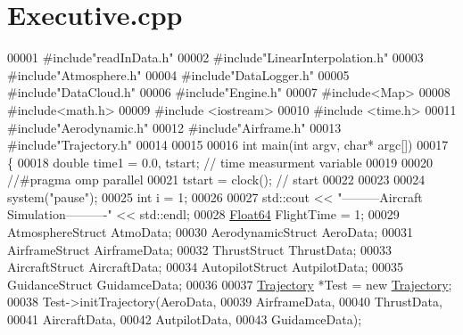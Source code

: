 \hypertarget{_executive_8cpp_source}{}\section{Executive.\+cpp}
\label{_executive_8cpp_source}

\begin{DoxyCode}
00001 \textcolor{preprocessor}{#include"readInData.h"}
00002 \textcolor{preprocessor}{#include"LinearInterpolation.h"}
00003 \textcolor{preprocessor}{#include"Atmosphere.h"}
00004 \textcolor{preprocessor}{#include"DataLogger.h"}
00005 \textcolor{preprocessor}{#include"DataCloud.h"}
00006 \textcolor{preprocessor}{#include"Engine.h"}
00007 \textcolor{preprocessor}{#include<Map>}
00008 \textcolor{preprocessor}{#include<math.h>}
00009 \textcolor{preprocessor}{#include <iostream>}
00010 \textcolor{preprocessor}{#include <time.h>} 
00011 \textcolor{preprocessor}{#include"Aerodynamic.h"}
00012 \textcolor{preprocessor}{#include"Airframe.h"}
00013 \textcolor{preprocessor}{#include"Trajectory.h"}
00014 
00015 
00016 \textcolor{keywordtype}{int} main(\textcolor{keywordtype}{int} argv, \textcolor{keywordtype}{char}* argc[])
00017 \{
00018     \textcolor{keywordtype}{double} time1 = 0.0, tstart;      \textcolor{comment}{// time measurment variable}
00019 
00020 \textcolor{comment}{//#pragma omp parallel }
00021         tstart = clock();              \textcolor{comment}{// start }
00022 
00023 
00024         system(\textcolor{stringliteral}{"pause"});
00025         \textcolor{keywordtype}{int} i = 1;
00026 
00027         std::cout << \textcolor{stringliteral}{"---------Aircraft Simulation----------"} << std::endl;
00028         \hyperlink{group___tools_ga3f1431cb9f76da10f59246d1d743dc2c}{Float64} FlightTime = 1;
00029         AtmosphereStruct    AtmoData;
00030         AerodynamicStruct   AeroData;
00031         AirframeStruct      AirframeData;
00032         ThrustStruct        ThrustData;
00033         AircraftStruct      AircraftData;
00034         AutopilotStruct     AutpilotData;
00035         GuidanceStruct      GuidamceData;
00036 
00037         \hyperlink{group___trajectory_class_trajectory}{Trajectory} *Test = \textcolor{keyword}{new} \hyperlink{group___trajectory_class_trajectory}{Trajectory};
00038         Test->initTrajectory(AeroData,
00039                             AirframeData,
00040                             ThrustData,
00041                             AircraftData,
00042                             AutpilotData,
00043                             GuidamceData);

\end{DoxyCode}
